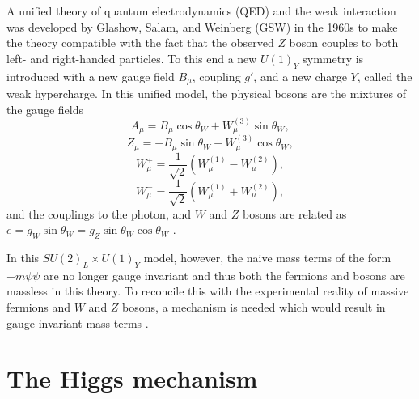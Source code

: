 A unified theory of quantum electrodynamics (QED) and the weak interaction was developed
by Glashow, Salam, and Weinberg (GSW) in the 1960s \cite{Thomson:2013zua} to make the
theory compatible with the fact that the observed $Z$ boson couples to both left- and
right-handed particles. To this end a new $U(1)_Y$ symmetry is introduced with a new gauge
field $B_\mu$, coupling $g'$, and a new charge $Y$, called the weak hypercharge. In this unified model,
the physical bosons are the mixtures of the gauge fields
\begin{equation}
A_\mu = B_\mu \cos\theta_W + W_\mu^{(3)} \sin{\theta_W},
\end{equation}
\begin{equation}
Z_\mu = - B_\mu \sin{\theta_W} + W_\mu^{(3)} \cos{\theta_W},
\end{equation}
\begin{equation}
W^+_\mu = \frac{1}{\sqrt{2}}\left( W_\mu^{(1)} - W_\mu^{(2)} \right),
\end{equation}
\begin{equation}
W^-_\mu = \frac{1}{\sqrt{2}}\left( W_\mu^{(1)} + W_\mu^{(2)} \right),
\end{equation}
and the couplings to the photon, and $W$ and $Z$ bosons are related as
$e = g_W \sin{\theta_W}  = g_Z \sin{\theta_W} \cos{\theta_W}$ \cite{Thomson:2013zua}.

In this $SU(2)_L \times U(1)_Y$ model, however, the naive mass terms of the form $-m\bar\psi\psi$
are no longer gauge invariant and thus both the fermions and bosons are massless in this theory.
To reconcile this with the experimental reality of massive fermions and $W$ and $Z$ bosons, a
mechanism is needed which would result in gauge invariant mass terms \cite{Thomson:2013zua}.

\section{The Higgs mechanism}

